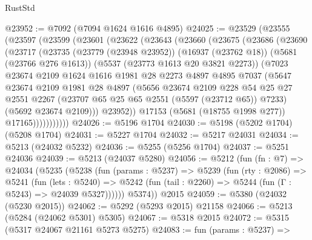 \begin{lexlean}{RustStd}
\begin{coremodule}
@23952 := @7092 (@7094 @1624 @1616 @4895)
@24025 := @23529
    (@23555
      (@23597
        (@23599
          (@23601
            (@23622
              (@23643
                (@23660
                  (@23675
                    (@23686
                      (@23690
                        (@23717
                          (@23735
                            (@23779 (@23948 @23952))
                            (@16937 (@23762 @18))
                            (@5681 (@23766 @276 @1613))
                            (@5537 (@23773 @1613 @20 @3821 @2273))
                            (@7023
                              @23674
                              @2109
                              @1624
                              @1616
                              @1981
                              @28
                              @2273
                              @4897
                              @4895
                              @7037
                              (@5647
                                @23674
                                @2109
                                @1981
                                @28
                                @4897
                                (@5656
                                  @23674
                                  @2109
                                  @228
                                  @54
                                  @25
                                  @27
                                  @2551
                                  @2267
                                  (@23707 @65 @25 @65 @2551 (@5597 (@23712 @65)) @7233)
                                  (@5692 @23674 @2109)))
                              @23952))
                          @17153
                          (@5681 (@18755 @1998 @277))
                          @17165)))))))))))
@24026 := @5196 @1704
@24030 := @5198 (@5202 @1704) (@5208 @1704)
@24031 := @5227 @1704
@24032 := @5217 @24031
@24034 := @5213 (@24032 @5232)
@24036 := @5255 (@5256 @1704)
@24037 := @5251 @24036
@24039 := @5213 (@24037 @5280)
@24056 := @5212
    (fun (fn : @7) =>
    @24034
      (@5235
        (@5238
          (fun (params : @5237) =>
          @5239
            (fun (rty : @2086) =>
            @5241
              (fun (lets : @5240) =>
              @5242 (fun (tail : @2260) => @5244 (fun (Γ : @5243) => @24039 @5327))))))
        @5374))
    @2015
@24059 := @5380 (@24032 (@5230 @2015))
@24062 := @5292 (@5293 @2015) @21158
@24066 := @5213 (@5284 (@24062 @5301) @5305)
@24067 := @5318 @2015
@24072 := @5315 (@5317 @24067 @21161 @5273 @5275)
@24083 := fun (params : @5237) =>

\end{coremodule}
\end{lexlean}

